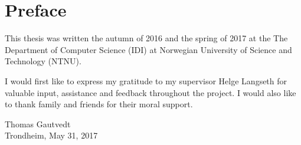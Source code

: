 
\chapter*{Preface}
This thesis was written the autumn of 2016 and the spring of 2017 at the The Department of Computer Science (IDI) at Norwegian University of Science and Technology (NTNU). \newline

\noindent I would first like to express my gratitude to my supervisor Helge Langseth for valuable input, assistance and feedback throughout the project. I would also like to thank family and friends for their moral support. \newline

\begin{flushright}
Thomas Gautvedt \\
Trondheim, May 31, 2017
\end{flushright}